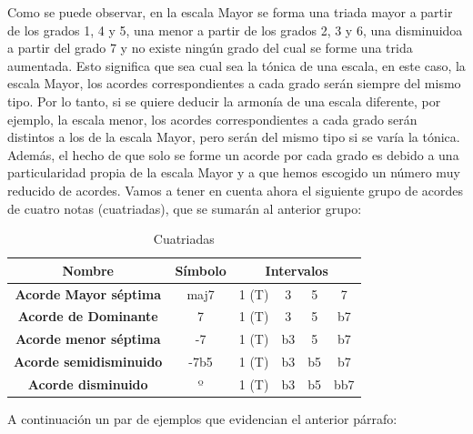    Como se puede observar, en la escala Mayor se forma una triada mayor a partir de los grados 1, 4 y 5, una menor a partir de los grados 2, 3 y 6, una disminuidoa a partir del grado 7 y no existe ningún grado del cual se forme una trida aumentada. Esto significa que sea cual sea la tónica de una escala, en este caso, la escala Mayor, los acordes correspondientes a cada grado serán siempre del mismo tipo. Por lo tanto, si se quiere deducir la armonía de una escala diferente, por ejemplo, la escala menor, los acordes correspondientes a cada grado serán distintos a los de la escala Mayor, pero serán del mismo tipo si se varía la tónica. Además, el hecho de que solo se forme un acorde por cada grado es debido a una particularidad propia de la escala Mayor y a que hemos escogido un número muy reducido de acordes. Vamos a tener en cuenta ahora el siguiente grupo de acordes de cuatro notas (cuatriadas), que se sumarán al anterior grupo:

\begin{table}[h]
    \centering
    \begin{tabular}{c|c|c|c|c|c}       
        \textbf{Nombre} & \textbf{Símbolo} & \multicolumn{4}{c}{\textbf{Intervalos}} \\
        \hline
        \hline
        \textbf{Acorde Mayor séptima} & maj7 & 1 (T) & 3 & 5 & 7\\
        \hline
        \textbf{Acorde de Dominante} & 7 & 1 (T) & 3 & 5 & b7\\
        \hline
        \textbf{Acorde menor séptima} & -7 & 1 (T) & b3 & 5 & b7 \\
        \hline
        \textbf{Acorde semidisminuido} & -7b5 & 1 (T) & b3 & b5 & b7 \\
        \hline
        \textbf{Acorde disminuido} & º & 1 (T) & b3 & b5 & bb7 \\
    \end{tabular}
    \caption{Cuatriadas}
    \label{tab:cuatriads}
\end{table}

    A continuación un par de ejemplos que evidencian el anterior párrafo: 

